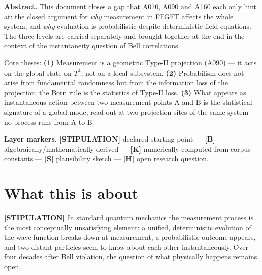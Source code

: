 
\providecommand{\qedsq}{\raisebox{0.03em}{\framebox[0.62em]{\rule{0pt}{0.42em}}}}

\begingroup\small\noindent
\textbf{Abstract.}
This document closes a gap that A070, A090 and A160 each only hint at:
the closed argument for \emph{why} measurement in FFGFT affects the whole
system, and \emph{why} evaluation is probabilistic despite deterministic
field equations. The three levels are carried separately and brought
together at the end in the context of the instantaneity question of
Bell correlations.

Core theses:
\textbf{(1)} Measurement is a geometric Type-II projection (A090) ---
it acts on the global state on $T^4$, not on a local subsystem.
\textbf{(2)} Probabilism does not arise from fundamental randomness
but from the information loss of the projection: the Born rule is the
statistics of Type-II loss.
\textbf{(3)} What appears as instantaneous action between two measurement
points A and B is the statistical signature of a global mode, read out
at two projection sites of the same system --- no process runs from A to B.
\par\endgroup

\bigskip

\begingroup\small\noindent
\textbf{Layer markers.}
\textbf{[STIPULATION]} declared starting point ---
\textbf{[B]} algebraically/mathematically derived ---
\textbf{[K]} numerically computed from corpus constants ---
\textbf{[S]} plausibility sketch ---
\textbf{[H]} open research question.
\par\endgroup

\bigskip

\section{What this is about}

\textbf{[STIPULATION]} In standard quantum mechanics the measurement
process is the most conceptually unsatisfying element: a unified,
deterministic evolution of the wave function breaks down at measurement,
a probabilistic outcome appears, and two distant particles seem to
know about each other instantaneously. Over four decades after Bell
violation, the question of what physically happens remains open.

